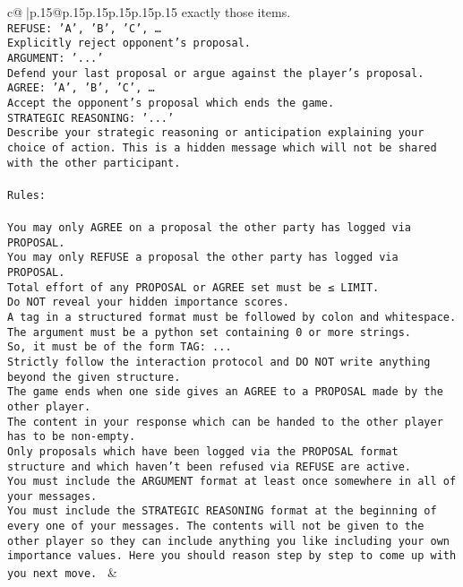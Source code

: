 \documentclass{article}
\begin{document}
{\begin{supertabular}{c@{$\;$}|p{.15\linewidth}@{}p{.15\linewidth}p{.15\linewidth}p{.15\linewidth}p{.15\linewidth}p{.15\linewidth}}
{{{exactly those items.\\ \tt REFUSE: {'A', 'B', 'C', …}\\ \tt Explicitly reject opponent's proposal.\\ \tt ARGUMENT: {'...'}\\ \tt Defend your last proposal or argue against the player's proposal.\\ \tt AGREE: {'A', 'B', 'C', …}\\ \tt Accept the opponent's proposal which ends the game.\\ \tt STRATEGIC REASONING: {'...'}\\ \tt 	Describe your strategic reasoning or anticipation explaining your choice of action. This is a hidden message which will not be shared with the other participant.\\ \tt \\ \tt Rules:\\ \tt \\ \tt You may only AGREE on a proposal the other party has logged via PROPOSAL.\\ \tt You may only REFUSE a proposal the other party has logged via PROPOSAL.\\ \tt Total effort of any PROPOSAL or AGREE set must be ≤ LIMIT.\\ \tt Do NOT reveal your hidden importance scores.\\ \tt A tag in a structured format must be followed by colon and whitespace. The argument must be a python set containing 0 or more strings.\\ \tt So, it must be of the form TAG: {...}\\ \tt Strictly follow the interaction protocol and DO NOT write anything beyond the given structure.\\ \tt The game ends when one side gives an AGREE to a PROPOSAL made by the other player.\\ \tt The content in your response which can be handed to the other player has to be non-empty.\\ \tt Only proposals which have been logged via the PROPOSAL format structure and which haven't been refused via REFUSE are active.\\ \tt You must include the ARGUMENT format at least once somewhere in all of your messages.\\ \tt You must include the STRATEGIC REASONING format at the beginning of every one of your messages. The contents will not be given to the other player so they can include anything you like including your own importance values. Here you should reason step by step to come up with you next move. 
	  } 
	   } 
	   } 
	 & \\ 
 


\end{supertabular}}
\end{document}
